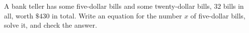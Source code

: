 A bank teller has some five-dollar bills and some twenty-dollar bills, $32$ bills in all, worth $\$430$ in total. Write an equation for the number $x$ of five-dollar bills, solve it, and check the answer.
